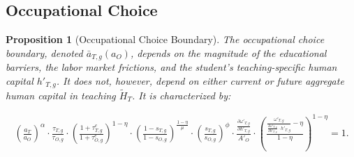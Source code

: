 \documentclass[onehalfspacing,11pt]{article}
\newtheorem{prp}{Proposition}
\begin{document}
		\subsection{Occupational Choice}%
	
	
	\begin{prp}[Occupational Choice Boundary] The occupational choice boundary, denoted $\bar{a}_{T,g}(a_O)$, depends on the magnitude of the educational barriers, the labor market frictions, and the student's teaching-specific human capital $h'_{T,g}$. It does not, however, depend on either current or future aggregate human capital in teaching $\widetilde{H}_T$. It is characterized by:
		
		\begin{align}
			\label{eq:occChoice}
			\left(\frac{a_T}{a_O}\right)^\alpha \cdot \frac{\tau_{T,g}}{\tau_{O,g}} \cdot \left(\frac{1+\tau^e_{T,g}}{1+\tau^e_{O,g}}\right)^{1-\eta}  \cdot \left(\frac{1-s_{T,g}}{1-s_{O,g}}\right)^\frac{1-\eta}{\mu} \cdot \left(\frac{s_{T,g}}{s_{O,g}}\right)^\phi \cdot \frac{\frac{\partial \omega'_{T,g}}{\partial h'_{T,g}}}{A'_O} \cdot \left(\frac{ \frac{\omega'_{T,g}}{\frac{\partial \omega'_{T,g}}{\partial h'_{T,g}} \cdot h'_{T,g}}-\eta}{1-\eta}\right)^{1-\eta}=1.
		\end{align}
	\end{prp}
	
\end{document}
